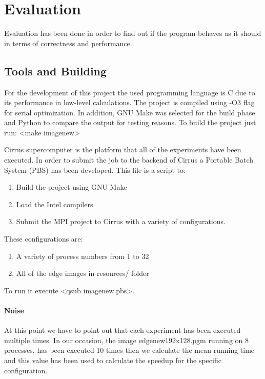 \documentclass[12pt,a4paper]{article}
\newcommand{\sectionVspacing}{\vspace{15pt}}
\begin{document}
\sectionVspacing

\section{Evaluation}
    Evaluation has been done in order to find out if the program behaves as it should in terms of correctness and performance.

    \subsection{Tools and Building}
        For the development of this project the used programming language is C due to its performance in low-level calculations. The project is compiled using -O3 flag for serial optimization. In addition, GNU Make was selected for the build phase and Python to compare the output for testing reasons. To build the project just run: <make imagenew>

        Cirrus supercomputer is the platform that all of the experiments have been executed. In order to submit the job to the backend of Cirrus a Portable Batch System (PBS) has been developed. This file is a script to:
        \begin{enumerate}
          \item Build the project using GNU Make
          \item Load the Intel compilers
          \item Submit the MPI project to Cirrus with a variety of configurations.
        \end{enumerate}

        These configurations are:
        \begin{enumerate}
          \item A variety of process numbers from 1 to 32
          \item All of the edge images in resources/ folder
        \end{enumerate}

        To run it execute <qsub imagenew.pbs>.

        \paragraph{Noise}
            At this point we have to point out that each experiment has been executed multiple times. In our occasion, the image edgenew192x128.pgm running on 8 processes, has been executed 10 times then we calculate the mean running time and this value has been used to calculate the speedup for the specific configuration.
\end{document}
